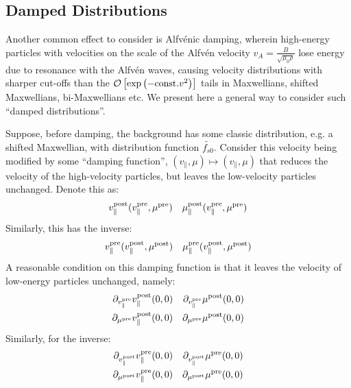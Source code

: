 \subsection{Damped Distributions}
    Another common effect to consider is Alfvénic damping, wherein high-energy particles with velocities on the scale of the Alfvén velocity $v_{A} = \frac{B}{\sqrt{\mu_{0}\rho}}$ lose energy due to resonance with the Alfvén waves, causing velocity distributions with sharper cut-offs than the $\mathcal{O}\left[\exp\left(- {\rm const.}v^{2}\right)\right]$ tails in Maxwellians, shifted Maxwellians, bi-Maxwellians etc. We present here a general way to consider such ``damped distributions''.
    
    Suppose, before damping, the background has some classic distribution, e.g. a shifted Maxwellian, with distribution function $\widetilde{f_{s0}}$. Consider this velocity being modified by some ``damping function'', $(v_{\parallel}, \mu) \mapsto (v_{\parallel}, \mu)$ that reduces the velocity of the high-velocity particles, but leaves the low-velocity particles unchanged. Denote this as:
    \begin{align}
        v_{\parallel}^{\rm post}(v_{\parallel}^{\rm pre}, \mu^{\rm pre})  &&
        \mu_{\parallel}^{\rm post}(v_{\parallel}^{\rm pre}, \mu^{\rm pre})
    \end{align}
    Similarly, this has the inverse:
    \begin{align}
        v_{\parallel}^{\rm pre}(v_{\parallel}^{\rm post}, \mu^{\rm post})  &&
        \mu_{\parallel}^{\rm pre}(v_{\parallel}^{\rm post}, \mu^{\rm post})
    \end{align}
    A reasonable condition on this damping function is that it leaves the velocity of low-energy particles unchanged, namely:
    \begin{align}
        \partial_{v_{\parallel}^{\rm pre}}v_{\parallel}^{\rm post}(0, 0)  &&
        \partial_{v_{\parallel}^{\rm pre}}\mu^{\rm post}(0, 0)  \\
        \partial_{\mu^{\rm pre}}v_{\parallel}^{\rm post}(0, 0)  &&
        \partial_{\mu^{\rm pre}}\mu^{\rm post}(0, 0)
    \end{align}
    Similarly, for the inverse:
    \begin{align}
        \partial_{v_{\parallel}^{\rm post}}v_{\parallel}^{\rm pre}(0, 0)  &&
        \partial_{v_{\parallel}^{\rm post}}\mu^{\rm pre}(0, 0)  \\
        \partial_{\mu^{\rm post}}v_{\parallel}^{\rm pre}(0, 0)  &&
        \partial_{\mu^{\rm post}}\mu^{\rm pre}(0, 0)
    \end{align}